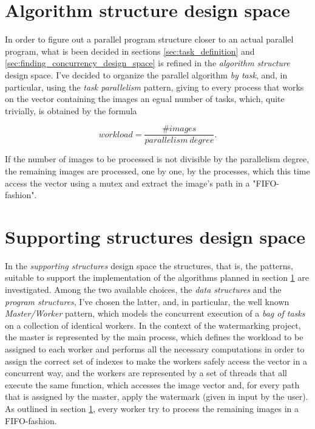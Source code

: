     \section{Algorithm structure design space} %
    \label{sec:algorithm_structure_design_space}
        In order to figure out a parallel program structure closer to an actual parallel program, what is been
        decided in sections \ref{sec:task_definition} and \ref{sec:finding_concurrency_design_space} is refined
        in the \textit{algorithm structure} design space. I've decided to organize the parallel algorithm
        \textit{by task}, and, in particular, using the \textit{task parallelism} pattern, giving to every
        process that works on the vector containing the images an egual number of tasks, which, quite trivially,
        is obtained by the formula

        \begin{equation*}
             \mathit{workload} = \frac{\mathit{\# images}}{parallelism \ degree}.
        \end{equation*}

        If the number of images to be processed is not divisible by the parallelism degree, the remaining images
        are processed, one by one, by the processes, which this time access the vector using a mutex and extract
        the image's path in a "FIFO-fashion".

    \section{Supporting structures design space} %
    \label{sec:supporting_structures_design_space}
        In the \textit{supporting structures} design space the structures, that is, the
        patterns, suitable to support the implementation of the algorithms planned in section
        \ref{sec:algorithm_structure_design_space} are investigated. Among the two available choices,
        the \textit{data structures} and the \textit{program structures}, I've chosen the latter, and, in
        particular, the well known \textit{Master/Worker} pattern, which models the concurrent execution of a
        \textit{bag of tasks} on a collection of identical workers. In the context of the watermarking project,
        the master is represented by the main process, which defines the workload to be assigned to each worker
        and performs all the necessary computations in order to assign the correct set of indexes to make the
        workers safely access the vector in a concurrent way, and the workers are represented by a set of
        threads that all execute the same function, which accesses the image vector and, for every path that is
        assigned by the master, apply the watermark (given in input by the user). As outlined in section
        \ref{sec:algorithm_structure_design_space}, every worker try to process the remaining images in a
        FIFO-fashion.

